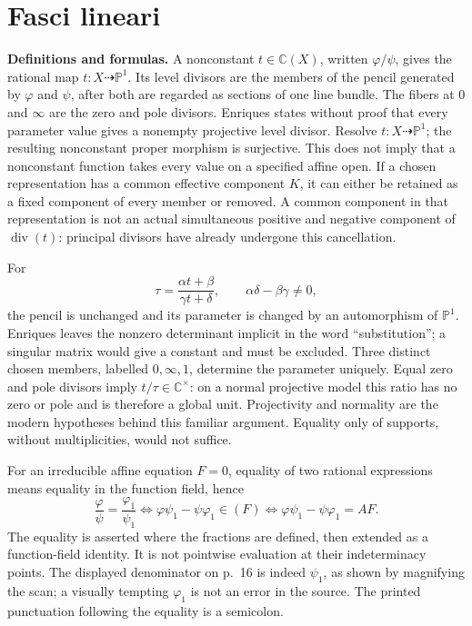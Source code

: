 \section{Fasci lineari}
\label{enriques-I-1}

\textbf{Definitions and formulas.} A nonconstant \(t\in\mathbb C(X)\), written \(\varphi/\psi\), gives the rational map \(t:X\dashrightarrow\mathbb P^1\). Its level divisors are the members of the pencil generated by \(\varphi\) and \(\psi\), after both are regarded as sections of one line bundle. The fibers at \(0\) and \(\infty\) are the zero and pole divisors. Enriques states without proof that every parameter value gives a nonempty projective level divisor. Resolve \(t:X\dashrightarrow\mathbb P^1\); the resulting nonconstant proper morphism is surjective. This does not imply that a nonconstant function takes every value on a specified affine open. If a chosen representation has a common effective component \(K\), it can either be retained as a fixed component of every member or removed. A common component in that representation is not an actual simultaneous positive and negative component of \(\operatorname{div}(t)\): principal divisors have already undergone this cancellation.

For \[
\tau=\frac{\alpha t+\beta}{\gamma t+\delta},
\qquad \alpha\delta-\beta\gamma\ne0,
\] the pencil is unchanged and its parameter is changed by an automorphism of \(\mathbb P^1\). Enriques leaves the nonzero determinant implicit in the word ``substitution''; a singular matrix would give a constant and must be excluded. Three distinct chosen members, labelled \(0,\infty,1\), determine the parameter uniquely. Equal zero and pole divisors imply \(t/\tau\in\mathbb C^\times\): on a normal projective model this ratio has no zero or pole and is therefore a global unit. Projectivity and normality are the modern hypotheses behind this familiar argument. Equality only of supports, without multiplicities, would not suffice.

For an irreducible affine equation \(F=0\), equality of two rational expressions means equality in the function field, hence \[
\frac{\varphi}{\psi}=\frac{\varphi_1}{\psi_1}
\iff \varphi\psi_1-\psi\varphi_1\in(F)
\iff \varphi\psi_1-\psi\varphi_1=AF.
\] The equality is asserted where the fractions are defined, then extended as a function-field identity. It is not pointwise evaluation at their indeterminacy points. The displayed denominator on p.~16 is indeed \(\psi_1\), as shown by magnifying the scan; a visually tempting \(\varphi_1\) is not an error in the source. The printed punctuation following the equality is a semicolon.

